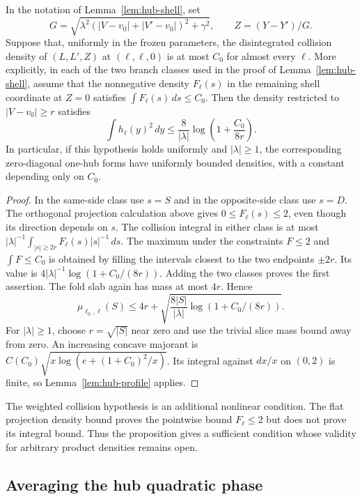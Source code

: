 \begin{proposition}
\label{prop:hub-weighted-collision}
In the notation of Lemma~\ref{lem:hub-shell}, set
\[
 G=\sqrt{\lambda^2
       (|V-v_0|+|V'-v_0|)^2+\gamma^2},
 \qquad Z=(Y-Y')/G.
\]
Suppose that, uniformly in the frozen parameters, the
disintegrated collision density of $(L,L',Z)$ at
$(\ell,\ell,0)$ is at most $C_0$ for almost every $\ell$.
More explicitly, in each of the two branch classes used in the proof
of Lemma~\ref{lem:hub-shell}, assume that the nonnegative density
$F_\ell(s)$ in the remaining shell coordinate at $Z=0$
satisfies $\int F_\ell(s)\,ds\le C_0$.
Then the density restricted to $|V-v_0|\ge r$ satisfies
\[
 \int h_\ell(y)^2\,dy
 \le\frac8{|\lambda|}
              \log\!\left(1+\frac{C_0}{8r}\right).
\]
In particular, if this hypothesis holds uniformly and
$|\lambda|\ge1$, the corresponding zero-diagonal one-hub forms
have uniformly bounded densities, with a constant depending only
on $C_0$.
\end{proposition}

\begin{proof}
In the same-side class use $s=S$ and in the opposite-side class
use $s=D$.  The orthogonal projection calculation above gives
$0\le F_\ell(s)\le2$, even though its direction depends on $s$.
The collision integral in either class is at most
$|\lambda|^{-1}\int_{|s|\ge2r}F_\ell(s)|s|^{-1}\,ds$.
The maximum under the constraints $F\le2$ and $\int F\le C_0$
is obtained by filling the intervals closest to the two endpoints
$\pm2r$.  Its value is
$4|\lambda|^{-1}\log(1+C_0/(8r))$.
Adding the two classes proves the first assertion.
The fold slab again has mass at most $4r$.  Hence
\[
 \mu_{\ell_0,\ell}(S)
 \le4r+\sqrt{\frac{8|S|}{|\lambda|}
                           \log(1+C_0/(8r))}.
\]
For $|\lambda|\ge1$, choose $r=\sqrt{|S|}$ near zero and use the
trivial slice mass bound away from zero.  An increasing concave
majorant is $C(C_0)\sqrt{x\log(e+(1+C_0)^2/x)}$.
Its integral against $dx/x$ on $(0,2)$ is finite, so
Lemma~\ref{lem:hub-profile} applies.
\end{proof}

The weighted collision hypothesis is an additional nonlinear
condition.  The flat projection density bound proves the
pointwise bound $F_\ell\le2$ but does not prove its integral
bound.  Thus the proposition gives a sufficient condition whose
validity for arbitrary product densities remains open.

\subsection{Averaging the hub quadratic phase}

